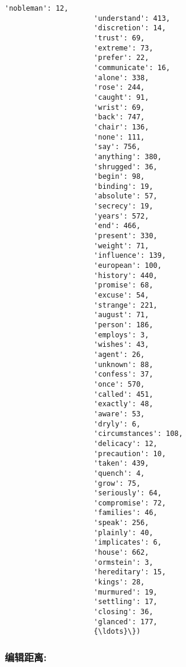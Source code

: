 \documentclass[11pt]{article}
\begin{document}
\begin{Verbatim}[commandchars=\\\{\}]
                     'nobleman': 12,
                     'understand': 413,
                     'discretion': 14,
                     'trust': 69,
                     'extreme': 73,
                     'prefer': 22,
                     'communicate': 16,
                     'alone': 338,
                     'rose': 244,
                     'caught': 91,
                     'wrist': 69,
                     'back': 747,
                     'chair': 136,
                     'none': 111,
                     'say': 756,
                     'anything': 380,
                     'shrugged': 36,
                     'begin': 98,
                     'binding': 19,
                     'absolute': 57,
                     'secrecy': 19,
                     'years': 572,
                     'end': 466,
                     'present': 330,
                     'weight': 71,
                     'influence': 139,
                     'european': 100,
                     'history': 440,
                     'promise': 68,
                     'excuse': 54,
                     'strange': 221,
                     'august': 71,
                     'person': 186,
                     'employs': 3,
                     'wishes': 43,
                     'agent': 26,
                     'unknown': 88,
                     'confess': 37,
                     'once': 570,
                     'called': 451,
                     'exactly': 48,
                     'aware': 53,
                     'dryly': 6,
                     'circumstances': 108,
                     'delicacy': 12,
                     'precaution': 10,
                     'taken': 439,
                     'quench': 4,
                     'grow': 75,
                     'seriously': 64,
                     'compromise': 72,
                     'families': 46,
                     'speak': 256,
                     'plainly': 40,
                     'implicates': 6,
                     'house': 662,
                     'ormstein': 3,
                     'hereditary': 15,
                     'kings': 28,
                     'murmured': 19,
                     'settling': 17,
                     'closing': 36,
                     'glanced': 177,
                     {\ldots}\})
\end{Verbatim}
            
    \subsubsection{编辑距离:}\label{ux7f16ux8f91ux8dddux79bb}
\end{document}
